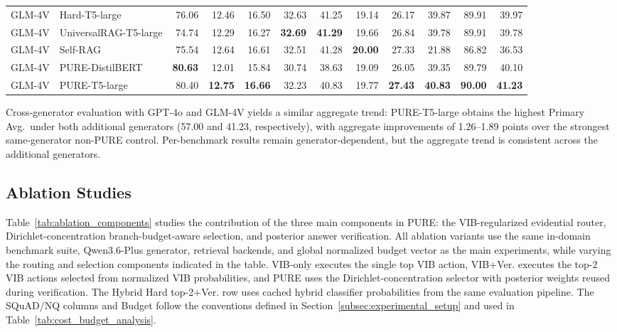 \documentclass[a4paper,fleqn]{cas-dc}
\begin{document}
\begin{table}[t]
\begin{tabular*}{\textwidth}{@{\extracolsep{\fill}}llrrrrrrrrrr@{}}
\midrule
GLM-4V & Hard-T5-large & 76.06 & 12.46 & 16.50 & 32.63 & 41.25 & 19.14 & 26.17 & 39.87 & 89.91 & 39.97 \\
GLM-4V & UniversalRAG-T5-large & 74.74 & 12.29 & 16.27 & \textbf{32.69} & \textbf{41.29} & 19.66 & 26.84 & 39.78 & 89.91 & 39.78 \\
GLM-4V & Self-RAG & 75.54 & 12.64 & 16.61 & 32.51 & 41.28 & \textbf{20.00} & 27.33 & 21.88 & 86.82 & 36.53 \\
GLM-4V & PURE-DistilBERT & \textbf{80.63} & 12.01 & 15.84 & 30.74 & 38.63 & 19.09 & 26.05 & 39.35 & 89.79 & 40.10 \\
GLM-4V & PURE-T5-large & 80.40 & \textbf{12.75} & \textbf{16.66} & 32.23 & 40.83 & 19.77 & \textbf{27.43} & \textbf{40.83} & \textbf{90.00} & \textbf{41.23} \\
\bottomrule
\end{tabular*}
\end{table}


Cross-generator evaluation with GPT-4o and GLM-4V yields a similar aggregate trend: PURE-T5-large obtains the highest Primary Avg.\ under both additional generators (57.00 and 41.23, respectively), with aggregate improvements of 1.26--1.89 points over the strongest same-generator non-PURE control. Per-benchmark results remain generator-dependent, but the aggregate trend is consistent across the additional generators.


\subsection{Ablation Studies}
\label{subsec:ablation_studies}

Table~\ref{tab:ablation_components} studies the contribution of the three main components in PURE: the VIB-regularized evidential router, Dirichlet-concentration branch-budget-aware selection, and posterior answer verification. All ablation variants use the same in-domain benchmark suite, Qwen3.6-Plus generator, retrieval backends, and global normalized budget vector as the main experiments, while varying the routing and selection components indicated in the table. VIB-only executes the single top VIB action, VIB+Ver. executes the top-$2$ VIB actions selected from normalized VIB probabilities, and PURE uses the Dirichlet-concentration selector with posterior weights reused during verification. The Hybrid Hard top-2+Ver. row uses cached hybrid classifier probabilities from the same evaluation pipeline. The SQuAD/NQ columns and Budget follow the conventions defined in Section~\ref{subsec:experimental_setup} and used in Table~\ref{tab:cost_budget_analysis}.
\end{document}

